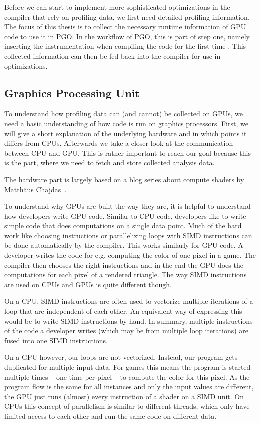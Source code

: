 Before we can start to implement more sophisticated optimizations in the compiler that rely on profiling data, we first need detailed profiling information. The focus of this thesis is to collect the necessary runtime information of GPU code to use it in PGO. In the workflow of PGO, this is part of step one, namely inserting the instrumentation when compiling the code for the first time%
. This collected information can then be fed back into the compiler for use in optimizations.

\subsection{Graphics Processing Unit}
To understand how profiling data can (and cannot) be collected on GPUs, we need a basic understanding of how code is run on graphics processors. First, we will give a short explanation of the underlying hardware and in which points it differs from CPUs. Afterwards we take a closer look at the communication between CPU and GPU. This is rather important to reach our goal because this is the part, where we need to fetch and store collected analysis data.

The hardware part is largely based on a blog series about compute shaders by Matthäus Chajdas~\cite{Chajdas2018}.

To understand why GPUs are built the way they are, it is helpful to understand how developers write GPU code. Similar to CPU code, developers like to write simple code that does computations on a single data point. Much of the hard work like choosing instructions or parallelizing loops with SIMD instructions can be done automatically by the compiler. This works similarly for GPU code. A developer writes the code for e.g. computing the color of one pixel in a game. The compiler then chooses the right instructions and in the end the GPU does the computations for each pixel of a rendered triangle. The way SIMD instructions are used on CPUs and GPUs is quite different though.

On a CPU, SIMD instructions are often used to vectorize multiple iterations of a loop that are independent of each other. An equivalent way of expressing this would be to write SIMD instructions by hand. In summary, multiple instructions of the code a developer writes (which may be from multiple loop iterations) are fused into one SIMD instructions.

On a GPU however, our loops are not vectorized. Instead, our program gets duplicated for multiple input data. For games this means the program is started multiple times -- one time per pixel -- to compute the color for this pixel. As the program flow is the same for all instances and only the input values are different, the GPU just runs (almost) every instruction of a shader on a SIMD unit. On CPUs this concept of parallelism is similar to different threads, which only have limited access to each other and run the same code on different data.

